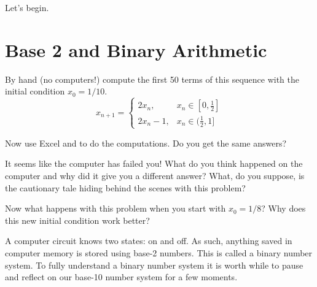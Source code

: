 \begin{center}
    Let's begin.
\end{center}
\section{Base 2 and Binary Arithmetic}
\begin{problem}\label{prob:base_10_faila}
    By hand (no computers!) compute the first 50 terms of this sequence with the initial condition $x_0 = 1/10$.
    \[ x_{n+1} = \left\{ \begin{array}{ll} 2x_n, & x_n \in [0,\frac{1}{2}] \\ 2x_n - 1, & x_n \in (\frac{1}{2},1] \end{array} \right. \]
    \end{problem}
\solution{
\[ x_n = \{1/10, 2/10, 4/10, 8/10, 6/10, 2/10, 4/10, 8/10, 6/10, \ldots \} \]
}

\begin{problem}\label{prob:base_10_failb}
Now use Excel and \ProgLang to do the computations.  Do you get the same answers?  
\end{problem}

\begin{problem}\label{prob:base_10_failc}
It seems like the computer has failed you!   What do you think happened on the computer
and why did it give you a different answer?  What, do you suppose, is the cautionary tale hiding behind the scenes with this problem?
\end{problem}

\begin{problem}
    Now what happens with this problem when you start with $x_0 = 1/8$?  Why does this new
    initial condition work better?
\end{problem}

A computer circuit knows two states: on and off.  As such, anything saved in computer
memory is stored using base-2 numbers.  This is called a binary number system.  To fully
understand a binary number system it is worth while to pause and reflect on our base-10
number system for a few moments. 

